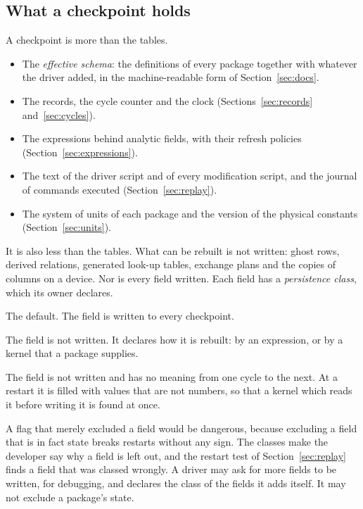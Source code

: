 \documentclass[11pt,a4paper]{article}
\begin{document}
\subsection{What a checkpoint holds}
\label{sec:checkpoint-holds}

A checkpoint is more than the tables.

\begin{itemize}
  \item The \emph{effective schema}: the definitions of every package
        together with whatever the driver added, in the machine-readable
        form of Section~\ref{sec:docs}.
  \item The records, the cycle counter and the clock
        (Sections~\ref{sec:records} and~\ref{sec:cycles}).
  \item The expressions behind analytic fields, with their refresh policies
        (Section~\ref{sec:expressions}).
  \item The text of the driver script and of every modification script, and
        the journal of commands executed (Section~\ref{sec:replay}).
  \item The system of units of each package and the version of the
        physical constants (Section~\ref{sec:units}).
\end{itemize}

It is also less than the tables.  What can be rebuilt is not written: ghost
rows, derived relations, generated look-up tables, exchange plans and the
copies of columns on a device.  Nor is every field written.  Each field has
a \emph{persistence class}, which its owner declares.

\begin{description}[style=nextline,leftmargin=2em]
  \item[State.]
        The default.  The field is written to every checkpoint.
  \item[Derived.]
        The field is not written.  It declares how it is rebuilt: by an
        expression, or by a kernel that a package supplies.
  \item[Scratch.]
        The field is not written and has no meaning from one cycle to the
        next.  At a restart it is filled with values that are not numbers,
        so that a kernel which reads it before writing it is found at once.
\end{description}

A flag that merely excluded a field would be dangerous, because excluding a
field that is in fact state breaks restarts without any sign.  The classes
make the developer say why a field is left out, and the restart test of
Section~\ref{sec:replay} finds a field that was classed wrongly.  A driver
may ask for more fields to be written, for debugging, and declares the
class of the fields it adds itself.  It may not exclude a package's state.
\end{document}
